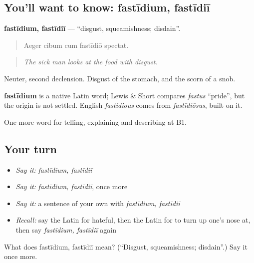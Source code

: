 \subsection*{You'll want to know: fastīdium, fastīdiī}
\textbf{fastīdium, fastīdiī} — \textquotedblleft{}disgust, squeamishness; disdain\textquotedblright{}.

\begin{quote}
Aeger cibum cum fastīdiō spectat.
\end{quote}

\begin{quote}
\emph{The sick man looks at the food with disgust.}
\end{quote}

Neuter, second declension. Disgust of the stomach, and the scorn of a snob.

\begin{cousinweb}
\textbf{fastīdium} is a native Latin word; Lewis \& Short compares \emph{fastus} \textquotedblleft{}pride\textquotedblright{}, but the origin is not settled. English \emph{fastidious} comes from \emph{fastīdiōsus}, built on it.
\end{cousinweb}

\begin{grammarlens}[title={What you've built}]
One more word for telling, explaining and describing at B1.
\end{grammarlens}

\subsection*{Your turn}
\begin{itemize}
\raggedright
  \item \emph{Say it:} \emph{fastīdium, fastīdiī}
  \item \emph{Say it:} \emph{fastīdium, fastīdiī}, once more
  \item \emph{Say it:} a sentence of your own with \emph{fastīdium, fastīdiī}
  \item \emph{Recall:} say the Latin for hateful, then the Latin for to turn up one's nose at, then say \emph{fastīdium, fastīdiī} again
\end{itemize}

\begin{tcolorbox}[breakable,colback=teal!4,colframe=teal!35!black,title={Before you move on}]
What does fastīdium, fastīdiī mean? (\textquotedblleft{}Disgust, squeamishness; disdain\textquotedblright{}.) Say it once more.
\end{tcolorbox}
